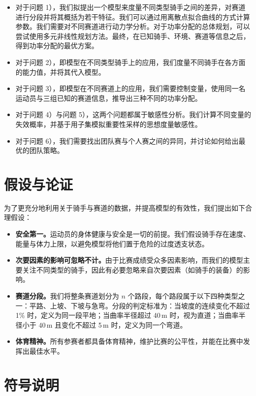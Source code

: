 \documentclass[11pt,a4paper]{ctexart}
\begin{document}
\begin{itemize}
\item 对于问题 1），我们拟提出一个模型来度量不同类型骑手之间的差异，对赛道进行分段并将其概括为若干特征。我们可以通过用离散点拟合曲线的方式计算参数。我们需要对不同赛道进行动力学分析。对于功率分配的总体规划，可以尝试使用多元非线性规划方法。最终，在已知骑手、环境、赛道等信息之后，得到功率分配的最优方案。
\item 对于问题 2），即模型在不同类型骑手上的应用，我们度量不同骑手在各方面的能力值，并将其代入模型。
\item 对于问题 3），即模型在不同赛道上的应用，我们需要控制变量，使用同一名运动员与三组已知的赛道信息，推导出三种不同的功率分配。
\item 对于问题 4）与问题 5），这两个问题都属于敏感性分析。我们计算不同变量的失效概率，并基于用子集模拟重要性采样的思想度量敏感性。
\item 对于问题 6），我们需要找出团队赛与个人赛之间的异同，并讨论如何给出最优的团队策略。
\end{itemize}

\section{假设与论证}

为了更充分地利用关于骑手与赛道的数据，并提高模型的有效性，我们提出如下合理假设：

\begin{itemize}
\item \textbf{安全第一。}运动员的身体健康与安全是一切的前提。我们假设骑手存在速度、能量与体力上限，以避免模型将他们置于危险的过度透支状态。
\item \textbf{次要因素的影响可忽略不计。}由于比赛成绩受众多因素影响，而我们的模型主要关注不同类型的骑手，因此有必要忽略来自次要因素（如骑手的装备）的影响。
\item \textbf{赛道分段。}我们将整条赛道划分为 $n$ 个路段，每个路段属于以下四种类型之一：平路、上坡、下坡与急弯。分段的判定标准为：当坡度的连续变化不超过 1\% 时，定义为同一段平地；当曲率半径超过 40\,m 时，视为直道；当曲率半径小于 40\,m 且变化不超过 5\,m 时，定义为同一个弯道。
\item \textbf{体育精神。}所有参赛者都具备体育精神，维护比赛的公平性，并能在比赛中发挥出最佳水平。
\end{itemize}

\section{符号说明}
\end{document}

